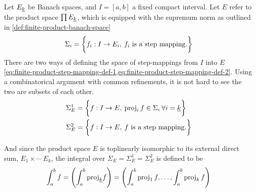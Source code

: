 \documentclass[../main-manifolds.tex]{subfiles}
\begin{document}
Let $\UL{E}[k]$ be Banach spaces, and $I = [a,b]$ a fixed compact interval. Let $E$ refer  to the product space $\prod \UL{E}[k]$, which is equipped with the supremum norm as outlined in \cref{def:finite-product-banach-space}
\[
    \Sigma_i = \biggl\{{f_i:I \to E_i,\: f_i \text{ is a step mapping.}}\biggr\}
\]
There are two ways of defining the space of step-mappings from $I$ into $E$ \cref{eq:finite-product-step-mapping-def-1,eq:finite-product-step-mapping-def-2}. Using a combinatorical argument with common refinements, it is not hard to see the two are subsets of each other.
\begin{align}
    \Sigma_{E}^1 &= \biggl\{{f:I\to E,\: \operatorname{proj}_i f\in \Sigma_i\:\forall i = \underline{k}}\biggr\}\label{eq:finite-product-step-mapping-def-1}\\
    \Sigma_{E}^2 &= \biggl\{{f:I\to E,\: f \text{ is a step mapping.}}\biggr\}\label{eq:finite-product-step-mapping-def-2}
\end{align}

And since the product space $E$ is toplinearly isomorphic to its external direct sum, $E_1\times \cdots\ E_k$, the integral over $\Sigma_{E} = \Sigma_{E}^1 = \Sigma_E^2$ is defined to be 
\begin{equation}\label{eq:finite-product-integration-product-space}
    \int_a^b f = \qty(\int_a^b\UL{\proj}[k]f) = \qty(\int_a^b\proj_1 f,\ldots,\int_a^b\proj_k f)
\end{equation}
\end{document}
